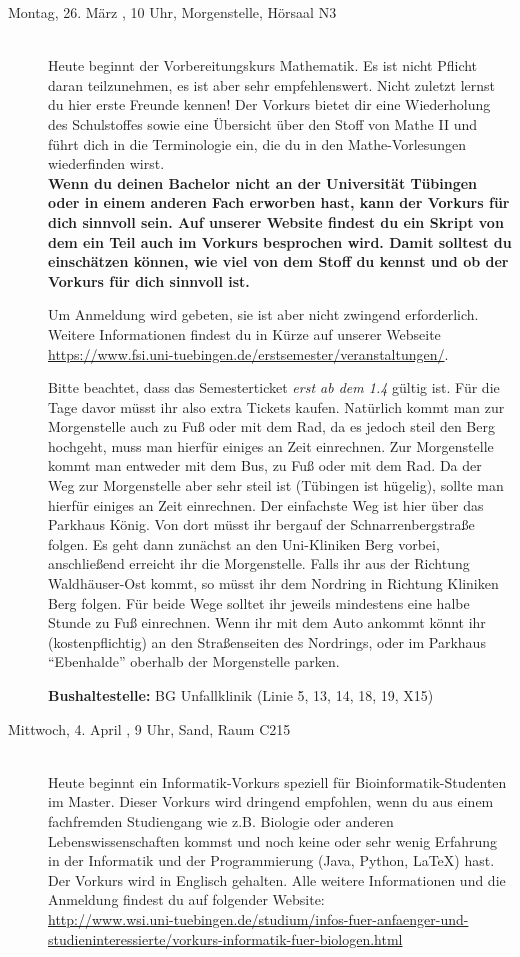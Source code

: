 \begin{description}
	
\item[Montag, 26. März \Jahr, 10 Uhr, Morgenstelle, Hörsaal N3]\ \\
Heute beginnt der Vorbereitungskurs Mathematik. Es ist nicht Pflicht daran teilzunehmen, 
es ist aber sehr empfehlenswert. Nicht zuletzt lernst du hier erste Freunde kennen!
Der Vorkurs bietet dir eine Wiederholung des Schulstoffes sowie eine Übersicht über den Stoff von Mathe II 
und führt dich in die Terminologie ein, die du in den Mathe-Vorlesungen wiederfinden wirst.
\ifmaster
\\
\textbf{Wenn du deinen Bachelor nicht an der Universität Tübingen oder in einem anderen Fach erworben hast, kann der Vorkurs für dich sinnvoll sein. Auf unserer Website findest du ein Skript von dem ein Teil auch im Vorkurs besprochen wird. Damit solltest du einschätzen können, wie viel von dem Stoff du kennst und ob der Vorkurs für dich sinnvoll ist.}
\fi

Um Anmeldung wird gebeten, sie ist aber nicht zwingend erforderlich. 
Weitere Informationen findest du in Kürze auf unserer Webseite \url{https://www.fsi.uni-tuebingen.de/erstsemester/veranstaltungen/}.

Bitte beachtet, dass das Semesterticket \emph{erst ab dem 1.4} gültig ist. Für die Tage davor müsst ihr also extra Tickets kaufen. Natürlich kommt man zur Morgenstelle auch zu Fuß oder mit dem Rad, da es jedoch steil den Berg hochgeht, muss man hierfür einiges an Zeit einrechnen.
Zur Morgenstelle kommt man entweder mit dem Bus, zu Fuß oder mit dem Rad. Da der Weg zur Morgenstelle aber sehr steil ist (Tübingen ist hügelig), sollte man hierfür einiges an Zeit einrechnen.
Der einfachste Weg ist hier über das Parkhaus König. Von dort müsst ihr bergauf der Schnarrenbergstraße folgen. Es geht dann zunächst an den Uni-Kliniken Berg vorbei, anschließend erreicht ihr die Morgenstelle. Falls ihr aus der Richtung Waldh\"auser-Ost kommt, so m\"usst ihr dem Nordring in Richtung Kliniken Berg folgen. Für beide Wege solltet ihr jeweils mindestens eine halbe Stunde zu Fuß einrechnen.
Wenn ihr mit dem Auto ankommt k\"onnt ihr (kostenpflichtig) an den Straßenseiten des Nordrings, oder im Parkhaus "`Ebenhalde"' oberhalb der Morgenstelle parken. 
   
\textbf{Bushaltestelle:} BG Unfallklinik (Linie 5, 13, 14, 18, 19, X15)


\ifmaster
\ifbinfo
\item[Mittwoch, 4. April \Jahr, 9 Uhr, Sand, Raum C215]\ \\
 Heute beginnt ein Informatik-Vorkurs speziell für Bioinformatik-Studenten im Master. Dieser Vorkurs wird dringend empfohlen, wenn du aus einem fachfremden Studiengang wie z.B. Biologie oder anderen Lebenswissenschaften kommst und noch keine oder sehr wenig Erfahrung in der Informatik und der Programmierung (Java, Python, \LaTeX) hast. Der Vorkurs wird in Englisch gehalten. Alle weitere Informationen und die Anmeldung findest du auf folgender Website: \\ \url{http://www.wsi.uni-tuebingen.de/studium/infos-fuer-anfaenger-und-studieninteressierte/vorkurs-informatik-fuer-biologen.html}


\end{description}
